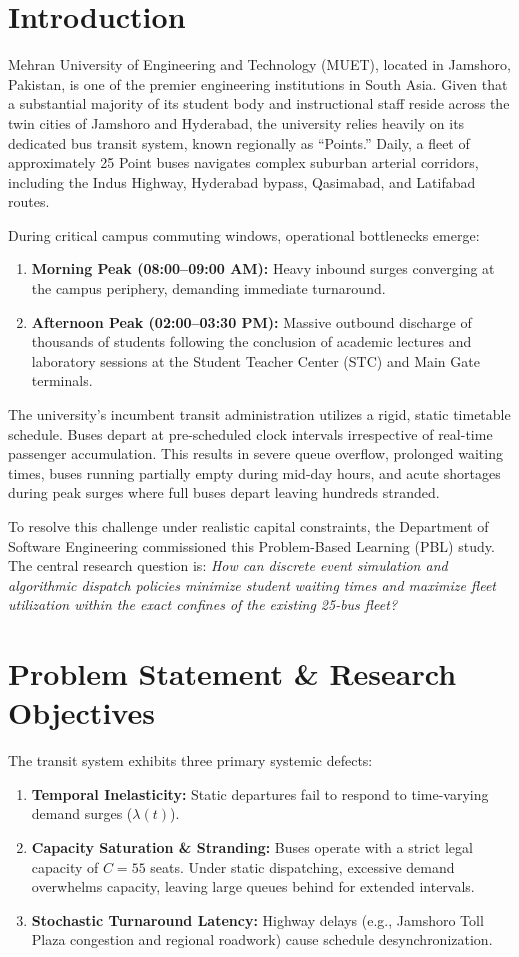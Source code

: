 \documentclass[conference]{IEEEtran}
\begin{document}
\section{Introduction}
Mehran University of Engineering and Technology (MUET), located in Jamshoro, Pakistan, is one of the premier engineering institutions in South Asia. Given that a substantial majority of its student body and instructional staff reside across the twin cities of Jamshoro and Hyderabad, the university relies heavily on its dedicated bus transit system, known regionally as ``Points.'' Daily, a fleet of approximately 25 Point buses navigates complex suburban arterial corridors, including the Indus Highway, Hyderabad bypass, Qasimabad, and Latifabad routes.

During critical campus commuting windows, operational bottlenecks emerge:
\begin{enumerate}
    \item \textbf{Morning Peak (08:00--09:00 AM):} Heavy inbound surges converging at the campus periphery, demanding immediate turnaround.
    \item \textbf{Afternoon Peak (02:00--03:30 PM):} Massive outbound discharge of thousands of students following the conclusion of academic lectures and laboratory sessions at the Student Teacher Center (STC) and Main Gate terminals.
\end{enumerate}

The university's incumbent transit administration utilizes a rigid, static timetable schedule. Buses depart at pre-scheduled clock intervals irrespective of real-time passenger accumulation. This results in severe queue overflow, prolonged waiting times, buses running partially empty during mid-day hours, and acute shortages during peak surges where full buses depart leaving hundreds stranded. 

To resolve this challenge under realistic capital constraints, the Department of Software Engineering commissioned this Problem-Based Learning (PBL) study. The central research question is: \textit{How can discrete event simulation and algorithmic dispatch policies minimize student waiting times and maximize fleet utilization within the exact confines of the existing 25-bus fleet?}

\section{Problem Statement \& Research Objectives}
The transit system exhibits three primary systemic defects:
\begin{enumerate}
    \item \textbf{Temporal Inelasticity:} Static departures fail to respond to time-varying demand surges ($\lambda(t)$).
    \item \textbf{Capacity Saturation \& Stranding:} Buses operate with a strict legal capacity of $C=55$ seats. Under static dispatching, excessive demand overwhelms capacity, leaving large queues behind for extended intervals.
    \item \textbf{Stochastic Turnaround Latency:} Highway delays (e.g., Jamshoro Toll Plaza congestion and regional roadwork) cause schedule desynchronization.
\end{enumerate}
\end{document}
